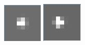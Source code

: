 \begin{figure}[!htb]
  \includegraphics[width=\linewidth]{Imagette1.JPG}
\endminipage\hfill
{}
  \includegraphics[width=\linewidth]{Imagette2.JPG}

\end{figure}
